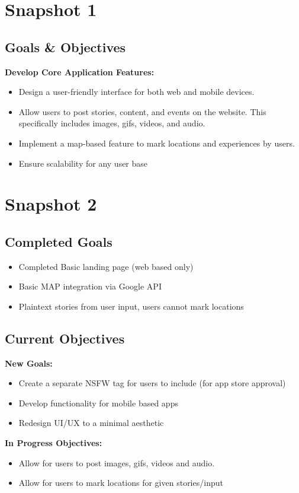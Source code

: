 \documentclass{article}
\begin{document}
\section{Snapshot 1}

\subsection{Goals \& Objectives}
\indent

\textbf{Develop Core Application Features:}
    \begin{itemize}
        \item Design a user-friendly interface for both web and mobile devices.
        \item Allow users to post stories, content, and events on the website. This specifically includes images, gifs, videos, and audio.
        \item Implement a map-based feature to mark locations and experiences by users.
        \item Ensure scalability for any user base \end{itemize}

\section{Snapshot 2}

\subsection{Completed Goals}
    \begin{itemize}
        \item Completed Basic landing page (web based only)
        \item Basic MAP integration via Google API
        \item Plaintext stories from user input, users cannot mark locations
    \end{itemize}
    
\subsection{Current Objectives}
\textbf{New Goals:}
    \begin{itemize}
        \item Create a separate NSFW tag for users to include (for app store approval)
        \item Develop functionality for mobile based apps
        \item Redesign UI/UX to a minimal aesthetic
    \end{itemize}
\textbf{In Progress Objectives:}
    \begin{itemize}
        \item Allow for users to post images, gifs, videos and audio.
        \item Allow for users to mark locations for given stories/input
    \end{itemize}
    
\end{document}
